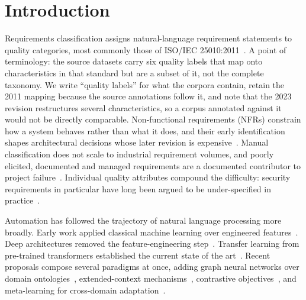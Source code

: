 \documentclass[11pt,a4paper]{article}
\begin{document}
\begin{center}
\end{center}

\medskip

\section{Introduction}
\label{sec:intro}

Requirements classification assigns natural-language requirement statements to quality
categories, most commonly those of ISO/IEC 25010:2011~\cite{iso25010}. A point of terminology: the source datasets carry six quality labels that map onto
characteristics in that standard but are a subset of it, not the complete taxonomy. We write
``quality labels'' for what the corpora contain, retain the 2011 mapping because the source
annotations follow it, and note that the 2023 revision restructures several characteristics, so
a corpus annotated against it would not be directly comparable. Non-functional
requirements (NFRs) constrain how a system behaves rather than what it does, and their
early identification shapes architectural decisions whose later revision is
expensive~\cite{iso29148,chung2012}. Manual classification does not scale to industrial requirement volumes, and poorly elicited, documented
and managed requirements are a documented contributor to project failure~\cite{hussain2016}. Individual
quality attributes compound the difficulty: security requirements in particular have long been argued to
be under-specified in practice~\cite{firesmith2003}.

Automation has followed the trajectory of natural language processing more broadly. Early
work applied classical machine learning over engineered features~\cite{casamayor2010,slankas2013,abad2017}. Deep architectures removed the feature-engineering step~\cite{haque2019,rahimi2021}. Transfer learning from pre-trained transformers established the current state of the art~\cite{hey2020,subahi2023}. Recent
proposals compose several paradigms at once, adding graph neural networks over domain
ontologies~\cite{liu2022,song2021}, extended-context
mechanisms~\cite{dai2019}, contrastive objectives~\cite{khosla2020}, and meta-learning
for cross-domain adaptation~\cite{finn2017,chen2025}.
\end{document}
